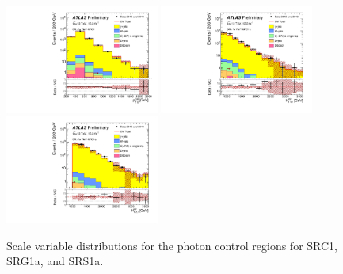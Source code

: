 \begin{figure}[tbp]
\begin{center}
\includegraphics[width=0.45\textwidth]{figures/ATLAS-CONF-2016-078_INT/N-1Plots/AtlasStyle/Preliminary/CRY_SRJigsawSRC1_LastCut_CRY_minusone}
\includegraphics[width=0.45\textwidth]{figures/ATLAS-CONF-2016-078_INT/N-1Plots/AtlasStyle/Preliminary/CRY_SRJigsawSRG1a_LastCut_CRY_minusone}
\includegraphics[width=0.45\textwidth]{figures/ATLAS-CONF-2016-078_INT/N-1Plots/AtlasStyle/Preliminary/CRY_SRJigsawSRS1a_LastCut_CRY_minusone}
\end{center}
\caption{Scale variable distributions for the photon control regions for SRC1, SRG1a, and SRS1a.}
\label{fig:CRY}
\end{figure}

